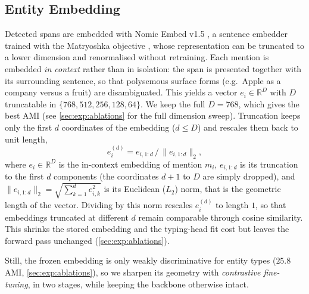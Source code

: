 \documentclass[pdflatex,sn-basic,Numbered]{sn-jnl}
\begin{document}
\subsection{Entity Embedding}
\label{sec:method:embed}
Detected spans are embedded with Nomic Embed v1.5 \cite{nussbaum2024nomic}, a sentence embedder trained with the Matryoshka objective \cite{kusupati2022matryoshka}, whose representation can be truncated to a lower dimension and renormalised without retraining.
Each mention is embedded \emph{in context} rather than in isolation: the span is presented together with its surrounding sentence, so that polysemous surface forms (e.g.\ Apple as a company versus a fruit) are disambiguated.
This yields a vector $e_i \in \mathbb{R}^{D}$ with $D$ truncatable in $\{768,512,256,128,64\}$. We keep the full $D{=}768$, which gives the best AMI (see \autoref{sec:exp:ablations} for the full dimension sweep).
Truncation keeps only the first $d$ coordinates of the embedding ($d \le D$) and rescales them back to unit length,
\begin{equation}
e_i^{(d)} = e_{i,1:d}\,\big/\,\lVert e_{i,1:d}\rVert_2 ,
\end{equation}
where $e_i \in \mathbb{R}^{D}$ is the in-context embedding of mention $m_i$, $e_{i,1:d}$ is its truncation to the first $d$ components (the coordinates $d{+}1$ to $D$ are simply dropped), and $\lVert e_{i,1:d}\rVert_2 = \sqrt{\sum_{k=1}^{d} e_{i,k}^2}$ is its Euclidean ($L_2$) norm, that is the geometric length of the vector. Dividing by this norm rescales $e_i^{(d)}$ to length $1$, so that embeddings truncated at different $d$ remain comparable through cosine similarity. This shrinks the stored embedding and the typing-head fit cost but leaves the forward pass unchanged (\autoref{sec:exp:ablations}).

\label{sec:method:contrastive}
Still, the frozen embedding is only weakly discriminative for entity types ($25.8$ AMI, \autoref{sec:exp:ablations}), so we sharpen its geometry with \emph{contrastive fine-tuning}, in two stages, while keeping the backbone otherwise intact.
\end{document}
